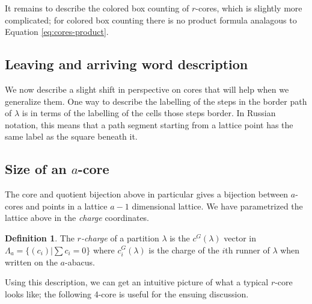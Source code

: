 \documentclass{amsart}[12pt]
\theoremstyle{definition}
\newtheorem{definition}[dummy]{Definition}
\begin{document}
It remains to describe the colored box counting of $r$-cores, which is slightly more complicated; for colored box counting there is no product formula analagous to Equation \eqref{eq:cores-product}.

\subsection{Leaving and arriving word description}







We now describe a slight shift in perspective on cores that will help when we generalize them.  One way to describe the labelling of the steps in the border path of $\lambda$ is in terms of the labelling of the cells those steps border.  In Russian notation, this means that a path segment starting from a lattice point has the same label as the square beneath it.



\subsection{Size of an \texorpdfstring{$a$}{a}-core}
The core and quotient bijection above in particular gives a bijection between $a$-cores and points in a lattice $a-1$ dimensional lattice.  We have parametrized the lattice above in the \emph{charge} coordinates.  


\begin{definition}
The \emph{$r$-charge} of a partition $\lambda$ is the $c^G(\lambda)$ vector in $\Lambda_a=\{(c_i)|\sum c_i=0\}$ where $c_i^G(\lambda)$ is the charge of the $i$th runner of $\lambda$ when written on the $a$-abacus.
\end{definition}

Using this description, we can get an intuitive picture of what a typical $r$-core looks like; the following 4-core is useful for the ensuing discussion.
\end{document}
